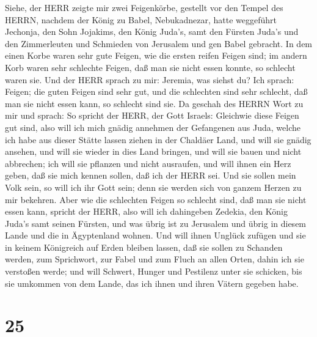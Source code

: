  Siehe, der HERR zeigte mir zwei Feigenkörbe, gestellt vor
den Tempel des HERRN, nachdem der König zu Babel, Nebukadnezar, hatte
weggeführt Jechonja, den Sohn Jojakims, den König Juda's, samt den
Fürsten Juda's und den Zimmerleuten und Schmieden von Jerusalem und gen
Babel gebracht.  In dem einen Korbe waren sehr gute Feigen,
wie die ersten reifen Feigen sind; im andern Korb waren sehr schlechte
Feigen, daß man sie nicht essen konnte, so schlecht waren sie.
 Und der HERR sprach zu mir: Jeremia, was siehst du? Ich
sprach: Feigen; die guten Feigen sind sehr gut, und die schlechten sind
sehr schlecht, daß man sie nicht essen kann, so schlecht sind sie.
 Da geschah des HERRN Wort zu mir und sprach: 
So spricht der HERR, der Gott Israels: Gleichwie diese Feigen gut sind,
also will ich mich gnädig annehmen der Gefangenen aus Juda, welche ich
habe aus dieser Stätte lassen ziehen in der Chaldäer Land, 
und will sie gnädig ansehen, und will sie wieder in dies Land bringen,
und will sie bauen und nicht abbrechen; ich will sie pflanzen und nicht
ausraufen,  und will ihnen ein Herz geben, daß sie mich
kennen sollen, daß ich der HERR sei. Und sie sollen mein Volk sein, so
will ich ihr Gott sein; denn sie werden sich von ganzem Herzen zu mir
bekehren.  Aber wie die schlechten Feigen so schlecht sind,
daß man sie nicht essen kann, spricht der HERR, also will ich dahingeben
Zedekia, den König Juda's samt seinen Fürsten, und was übrig ist zu
Jerusalem und übrig in diesem Lande und die in Ägyptenland wohnen.
 Und will ihnen Unglück zufügen und sie in keinem Königreich
auf Erden bleiben lassen, daß sie sollen zu Schanden werden, zum
Sprichwort, zur Fabel und zum Fluch an allen Orten, dahin ich sie
verstoßen werde;  und will Schwert, Hunger und Pestilenz
unter sie schicken, bis sie umkommen von dem Lande, das ich ihnen und
ihren Vätern gegeben habe.

\hypertarget{section-24}{%
\section{25}\label{section-24}}

